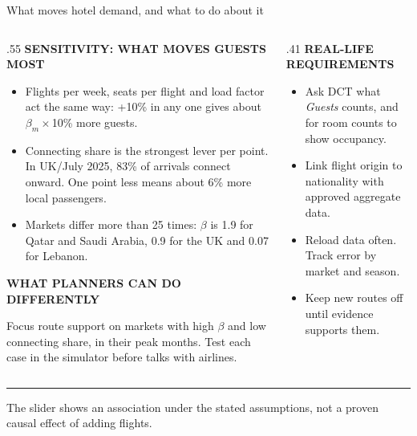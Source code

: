 \documentclass[aspectratio=169,10pt]{beamer}
\newcommand{\kicker}[1]{{\color{Accent}\scriptsize\bfseries\MakeUppercase{#1}}\par\vspace{.16cm}}
\newcommand{\smallnote}[1]{{\color{Muted}\scriptsize #1}}
\begin{document}
\begin{frame}{What moves hotel demand, and what to do about it}
  \begin{columns}[T,totalwidth=\linewidth]
    \begin{column}{.55\linewidth}
      \small
      \kicker{Sensitivity: what moves guests most}
      \begin{itemize}\setlength\itemsep{.08cm}
        \item Flights per week, seats per flight and load factor act the same way: +10\% in any one gives about $\beta_m\times$10\% more guests.
        \item Connecting share is the strongest lever per point. In UK/July 2025, 83\% of arrivals connect onward. One point less means about 6\% more local passengers.
        \item Markets differ more than 25 times: $\beta$ is 1.9 for Qatar and Saudi Arabia, 0.9 for the UK and 0.07 for Lebanon.
      \end{itemize}
      \kicker{What planners can do differently}
      Focus route support on markets with high $\beta$ and low connecting share, in their peak months. Test each case in the simulator before talks with airlines.
    \end{column}
    \begin{column}{.41\linewidth}
      \small
      \kicker{Real-life requirements}
      \begin{itemize}\setlength\itemsep{.08cm}
        \item Ask DCT what \emph{Guests} counts, and for room counts to show occupancy.
        \item Link flight origin to nationality with approved aggregate data.
        \item Reload data often. Track error by market and season.
        \item Keep new routes off until evidence supports them.
      \end{itemize}
    \end{column}
  \end{columns}
  \vfill
  {\color{Rule}\rule{\linewidth}{.5pt}}\par
  \smallnote{The slider shows an association under the stated assumptions, not a proven causal effect of adding flights.}
\end{frame}
\end{document}
